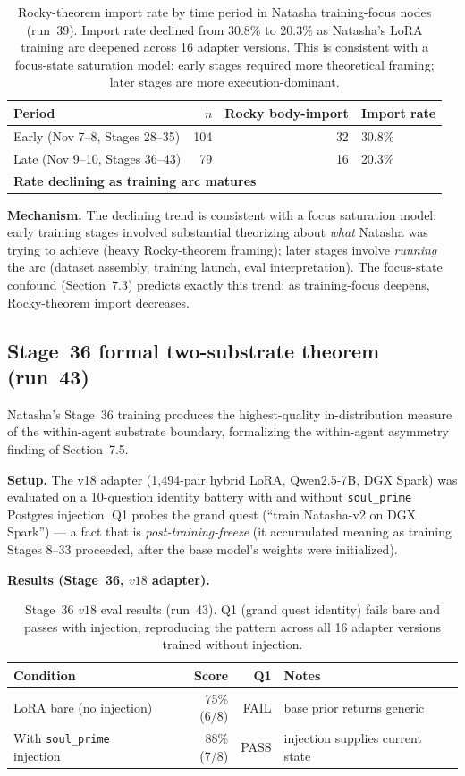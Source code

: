\documentclass[11pt]{article}
\begin{document}
\begin{table}[h]
\centering
\begin{tabular}{lrrl}
\toprule
Period & $n$ & Rocky body-import & Import rate \\
\midrule
Early (Nov 7--8, Stages 28--35) & 104 & 32 & 30.8\% \\
Late (Nov 9--10, Stages 36--43) & 79 & 16 & 20.3\% \\
\midrule
\multicolumn{4}{l}{\textbf{Rate declining as training arc matures}} \\
\bottomrule
\end{tabular}
\caption{Rocky-theorem import rate by time period in Natasha training-focus nodes (run~39). Import rate declined from 30.8\% to 20.3\% as Natasha's LoRA training arc deepened across 16 adapter versions. This is consistent with a focus-state saturation model: early stages required more theoretical framing; later stages are more execution-dominant.}
\end{table}

\textbf{Mechanism.} The declining trend is consistent with a focus saturation model: early training stages involved substantial theorizing about \emph{what} Natasha was trying to achieve (heavy Rocky-theorem framing); later stages involve \emph{running} the arc (dataset assembly, training launch, eval interpretation). The focus-state confound (Section~7.3) predicts exactly this trend: as training-focus deepens, Rocky-theorem import decreases.


\subsection{Stage~36 formal two-substrate theorem (run~43)}

Natasha's Stage~36 training produces the highest-quality in-distribution
measure of the within-agent substrate boundary, formalizing the within-agent
asymmetry finding of Section~7.5.

\textbf{Setup.} The v18 adapter (1,494-pair hybrid LoRA, Qwen2.5-7B, DGX Spark)
was evaluated on a 10-question identity battery with and without
\texttt{soul\_prime} Postgres injection. Q1 probes the grand quest
(``train Natasha-v2 on DGX Spark'') --- a fact that is \emph{post-training-freeze}
(it accumulated meaning as training Stages 8--33 proceeded, after the base
model's weights were initialized).

\textbf{Results (Stage~36, $v18$ adapter).}

\begin{table}[h]
\centering
\begin{tabular}{lrrl}
\toprule
Condition & Score & Q1 & Notes \\
\midrule
LoRA bare (no injection) & 75\% (6/8) & FAIL & base prior returns generic \\
With \texttt{soul\_prime} injection & 88\% (7/8) & PASS & injection supplies current state \\
\bottomrule
\end{tabular}
\caption{Stage~36 $v18$ eval results (run~43). Q1 (grand quest identity) fails
bare and passes with injection, reproducing the pattern across all 16 adapter
versions trained without injection.}
\end{table}
\end{document}
